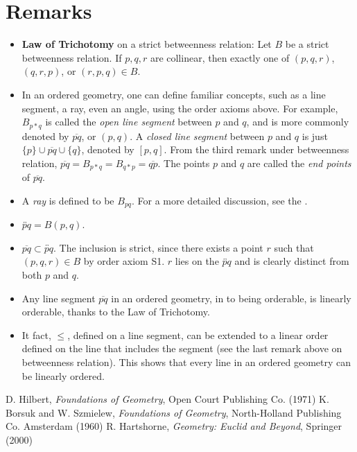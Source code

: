 \documentclass[12pt]{article}
\renewcommand{\line}[1]{\overleftrightarrow{#1}}
\begin{document}
\section{Remarks}
\begin{itemize}
\item \textbf{Law of Trichotomy} on a strict betweenness relation:  Let $B$
be a strict betweenness relation. If $p,q,r$ are collinear, then
exactly one of $(p,q,r)$, $(q,r,p)$, or $(r,p,q)\in B$.
\item In an ordered geometry, one can define familiar concepts, such as a
line segment, a ray, even an angle, using the order axioms above.  For example, $B_{p*q}$ is called the \emph{open line segment} between $p$ and $q$, and is more commonly denoted by $\overline{pq}$, or $(p,q)$. A \emph{closed line segment} between $p$ and $q$ is just $\lbrace p\rbrace \cup \overline{pq}\cup \lbrace q\rbrace$, denoted by $[p,q]$.  From the third remark under betweenness relation, $\overline{pq}=B_{p*q}=B_{q*p}=\overline{qp}$. The points $p$ and $q$ are called the \emph{end points} of $\overline{pq}$.  
\item A \emph{ray} is defined to be $B_{pq}$.  For a more detailed discussion, see the .
\item $\line{pq}=B(p,q)$.
\item $\overline{pq}\subset\line{pq}$.  The inclusion is strict,
since there exists a point $r$ such that $(p,q,r)\in B$ by order
axiom S1.  $r$ lies on the $\line{pq}$ and is clearly distinct from
both $p$ and $q$.
\item Any line segment $\overline{pq}$ in an ordered geometry, in  to being orderable, is linearly orderable, thanks to the Law of Trichotomy.
\item It fact, $\le$, defined on a line segment, can be extended to a linear order defined on the line that includes the segment (see the last remark above on betweenness relation).  This shows that every line in an ordered geometry can be linearly ordered.
\end{itemize}

\begin{thebibliography}{6}
 D. Hilbert, {\it Foundations of Geometry}, Open Court Publishing Co. (1971)
 K. Borsuk and W. Szmielew, {\it Foundations of Geometry}, North-Holland Publishing Co. Amsterdam (1960)
 R. Hartshorne, {\it Geometry: Euclid and Beyond}, Springer (2000)
\end{thebibliography}
\end{document}
